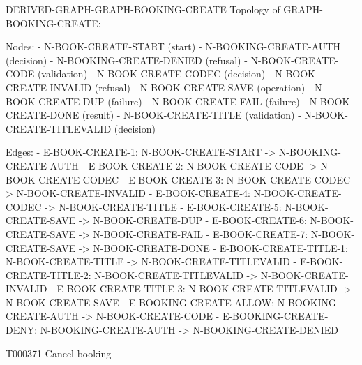 \documentclass[11pt,a4paper]{article}
\begin{document}
\begin{atlasderived}{DERIVED-GRAPH-GRAPH-BOOKING-CREATE}
Topology of GRAPH-BOOKING-CREATE:

Nodes:
- N-BOOK-CREATE-START (start)
- N-BOOKING-CREATE-AUTH (decision)
- N-BOOKING-CREATE-DENIED (refusal)
- N-BOOK-CREATE-CODE (validation)
- N-BOOK-CREATE-CODEC (decision)
- N-BOOK-CREATE-INVALID (refusal)
- N-BOOK-CREATE-SAVE (operation)
- N-BOOK-CREATE-DUP (failure)
- N-BOOK-CREATE-FAIL (failure)
- N-BOOK-CREATE-DONE (result)
- N-BOOK-CREATE-TITLE (validation)
- N-BOOK-CREATE-TITLEVALID (decision)

Edges:
- E-BOOK-CREATE-1: N-BOOK-CREATE-START -> N-BOOKING-CREATE-AUTH
- E-BOOK-CREATE-2: N-BOOK-CREATE-CODE -> N-BOOK-CREATE-CODEC
- E-BOOK-CREATE-3: N-BOOK-CREATE-CODEC -> N-BOOK-CREATE-INVALID
- E-BOOK-CREATE-4: N-BOOK-CREATE-CODEC -> N-BOOK-CREATE-TITLE
- E-BOOK-CREATE-5: N-BOOK-CREATE-SAVE -> N-BOOK-CREATE-DUP
- E-BOOK-CREATE-6: N-BOOK-CREATE-SAVE -> N-BOOK-CREATE-FAIL
- E-BOOK-CREATE-7: N-BOOK-CREATE-SAVE -> N-BOOK-CREATE-DONE
- E-BOOK-CREATE-TITLE-1: N-BOOK-CREATE-TITLE -> N-BOOK-CREATE-TITLEVALID
- E-BOOK-CREATE-TITLE-2: N-BOOK-CREATE-TITLEVALID -> N-BOOK-CREATE-INVALID
- E-BOOK-CREATE-TITLE-3: N-BOOK-CREATE-TITLEVALID -> N-BOOK-CREATE-SAVE
- E-BOOKING-CREATE-ALLOW: N-BOOKING-CREATE-AUTH -> N-BOOK-CREATE-CODE
- E-BOOKING-CREATE-DENY: N-BOOKING-CREATE-AUTH -> N-BOOKING-CREATE-DENIED
\end{atlasderived}
\par{}\hypertarget{technical-GRAPH-BOOKING-CANCEL}{}
\begin{atlastext}{T000371}
Cancel booking
\end{atlastext}
\par{}
\end{document}
